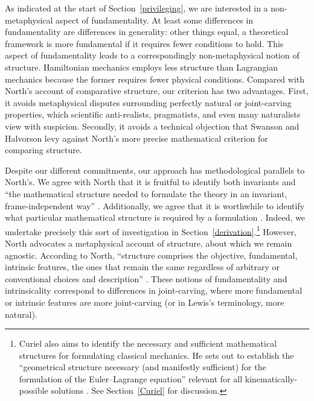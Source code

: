 \documentclass[12pt, twoside]{article}
\begin{document}
As indicated at the start of Section~\ref{privileging}, we are interested in a non-metaphysical aspect of fundamentality. At least some differences in fundamentality are differences in generality: other things equal, a theoretical framework is more fundamental if it requires fewer conditions to hold. This aspect of fundamentality leads to a correspondingly non-metaphysical notion of structure. Hamiltonian mechanics employs less structure than Lagrangian mechanics because the former requires fewer physical conditions. Compared with North's \parencites*[]{North} account of comparative structure, our criterion has two advantages. First, it avoids metaphysical disputes surrounding perfectly natural or joint-carving properties, which scientific anti-realists, pragmatists, and even many naturalists view with suspicion. Secondly, it avoids a technical objection that Swanson and Halvorson \parencites*[]{Swanson} levy against North's more precise mathematical criterion for comparing structure. 

Despite our different commitments, our approach has methodological parallels to North's. We agree with North that it is fruitful to identify both invariants and ``the mathematical structure needed to formulate the theory in an invariant, frame-independent way'' \parencites*[65]{North}. Additionally, we agree that it is worthwhile to identify what particular mathematical structure is required by a formulation \parencites[78]{North}. Indeed, we undertake precisely this sort of investigation in Section~\ref{derivation}.\footnote{Curiel also aims to identify the necessary and sufficient mathematical structures for formulating classical mechanics. He sets out to establish the ``geometrical structure necessary (and manifestly sufficient) for the formulation of the Euler--Lagrange equation'' relevant for all kinematically-possible solutions \parencites*[292]{Curiel}. See Section~\ref{Curiel} for discussion.} However, North advocates a metaphysical account of structure, about which we remain agnostic. According to North, ``structure comprises the objective, fundamental, intrinsic features, the ones that remain the same regardless of arbitrary or conventional choices and description'' \parencites*[66]{North}. These notions of fundamentality and intrinsicality correspond to differences in joint-carving, where more fundamental or intrinsic features are more joint-carving (or in Lewis's \parencites*[]{Lewis1983} terminology, more natural). 
\end{document}
